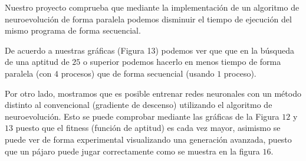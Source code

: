\documentclass[twocolumn,spanish]{revtex4-1}
\begin{document}
Nuestro proyecto comprueba que mediante la implementación de un algoritmo de neuroevolución de forma paralela podemos disminuir el tiempo de ejecución del mismo programa de forma secuencial.

De acuerdo a nuestras gráficas (Figura 13) podemos ver que que en la búsqueda de una aptitud de $25$ o superior podemos hacerlo en menos tiempo de forma paralela (con $4$ procesos) que de forma secuencial (usando $1$ proceso). 

Por otro lado, mostramos que es posible entrenar redes neuronales con un método distinto al convencional (gradiente de descenso) utilizando el algoritmo de neuroevolución. Esto se puede comprobar mediante las gráficas de la Figura $12$ y $13$ puesto que el fitness (función de aptitud) es cada vez mayor, asimismo se puede ver de forma experimental visualizando una generación avanzada, puesto que un pájaro puede jugar correctamente como se muestra en la figura $16$. 

\newpage

\onecolumngrid


 
\end{document}
